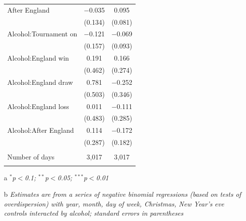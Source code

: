 \documentclass[12pt, letterpaper]{article}
\begin{document}
{\begin{table}[htp]
{\begin{threeparttable}
\begin{tabular}{@{\extracolsep{5pt}}lcc}
  After England & $-$0.035 & 0.095 \\ 
  & (0.134) & (0.081) \\ 
  Alcohol:Tournament on & $-$0.121 & $-$0.069 \\ 
  & (0.157) & (0.093) \\ 
  Alcohol:England win & 0.191 & 0.166 \\ 
  & (0.462) & (0.274) \\ 
  Alcohol:England draw & 0.781 & $-$0.252 \\ 
  & (0.503) & (0.346) \\ 
  Alcohol:England loss & 0.011 & $-$0.111 \\ 
  & (0.483) & (0.285) \\ 
  Alcohol:After England & 0.114 & $-$0.172 \\ 
  & (0.287) & (0.182) \\ 
 \hline \\[-1.8ex] 
Number of days & 3,017 & 3,017  \\ 
\hline 
\hline \\[-1.8ex] 
\end{tabular}
\begin{tablenotes}
      \item[a] \textit{$^{*}$p$<$0.1; $^{**}$p$<$0.05; $^{***}$p$<$0.01}
      \item[b] \textit{Estimates are from a series of negative binomial regressions (based on tests of overdispersion)  with year, month, day of week, Christmas, New Year's eve controls interacted by alcohol; standard errors in parentheses}
    \end{tablenotes}
\end{threeparttable} } 
\end{table}
\newpage




}
\end{document}
